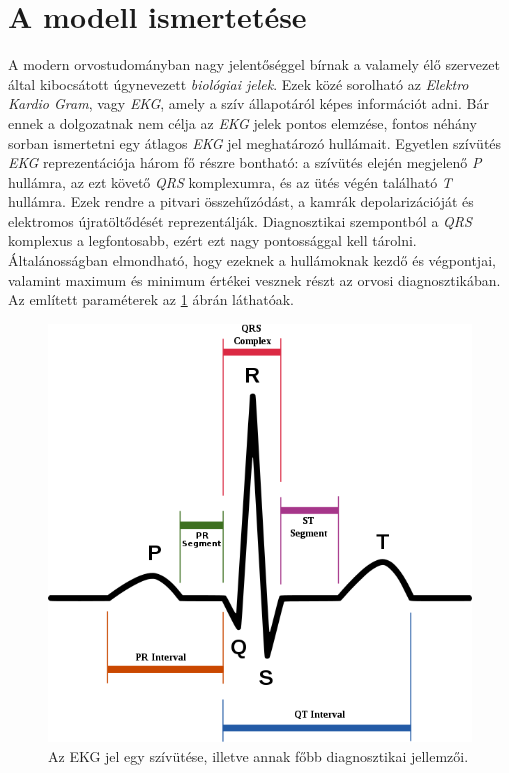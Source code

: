 \documentclass[oneside,titlepage,12pt,a4paper]{report}
\begin{document}
\section{A modell ismertetése}
A modern orvostudományban nagy jelentőséggel bírnak 
a valamely élő szervezet által kibocsátott úgynevezett \textit{biológiai jelek}. Ezek közé sorolható az \textit{Elektro Kardio Gram}, vagy \textit{EKG},
amely a szív állapotáról képes információt adni. Bár ennek a dolgozatnak nem célja az \textit{EKG} jelek pontos elemzése, fontos néhány sorban ismertetni egy átlagos \textit{EKG} jel meghatározó hullámait. Egyetlen szívütés  \textit{EKG} reprezentációja három fő részre bontható: a szívütés elején megjelenő \textit{P} hullámra, az ezt követő \textit{QRS} komplexumra, és az ütés végén található \textit{T} hullámra. Ezek rendre a pitvari összehűzódást, a kamrák depolarizációját és elektromos újratöltődését reprezentálják. Diagnosztikai szempontból a \textit{QRS} komplexus a legfontosabb, ezért ezt nagy pontossággal kell tárolni. Általánosságban elmondható, hogy ezeknek a hullámoknak kezdő és végpontjai, valamint maximum és minimum értékei vesznek részt az orvosi diagnosztikában. Az említett paraméterek az \ref{fig:ekg} ábrán láthatóak.

\begin{figure}[htb!]
\begin{center}
   \includegraphics[scale=0.37]{./Abrak/Egyeb/ecg_wiki.png}
   \caption{Az EKG jel egy szívütése, illetve annak főbb diagnosztikai jellemzői.}
		\label{fig:ekg}
\end{center}
\end{figure}
 
\end{document}
